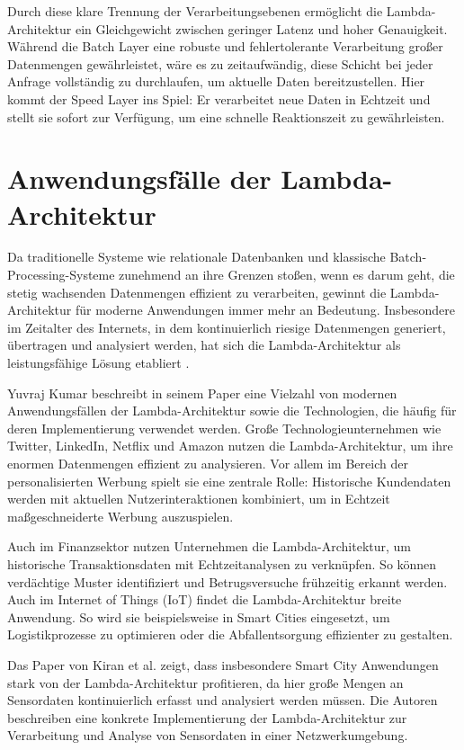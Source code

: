 Durch diese klare Trennung der Verarbeitungsebenen ermöglicht die Lambda-Architektur ein Gleichgewicht zwischen geringer Latenz und hoher Genauigkeit. Während die Batch Layer eine robuste und fehlertolerante Verarbeitung großer Datenmengen gewährleistet, wäre es zu zeitaufwändig, diese Schicht bei jeder Anfrage vollständig zu durchlaufen, um aktuelle Daten bereitzustellen. Hier kommt der Speed Layer ins Spiel: Er verarbeitet neue Daten in Echtzeit und stellt sie sofort zur Verfügung, um eine schnelle Reaktionszeit zu gewährleisten.

\section{Anwendungsfälle der Lambda-Architektur}
Da traditionelle Systeme wie relationale Datenbanken und klassische Batch-Processing-Systeme zunehmend an ihre Grenzen stoßen, wenn es darum geht, die stetig wachsenden Datenmengen effizient zu verarbeiten, gewinnt die Lambda-Architektur für moderne Anwendungen immer mehr an Bedeutung. Insbesondere im Zeitalter des Internets, in dem kontinuierlich riesige Datenmengen generiert, übertragen und analysiert werden, hat sich die Lambda-Architektur als leistungsfähige Lösung etabliert \cite{kumar2020lambda,kiran2015lambda,katkar2015study}.

Yuvraj Kumar \cite{kumar2020lambda} beschreibt in seinem Paper eine Vielzahl von modernen Anwendungsfällen der Lambda-Architektur sowie die Technologien, die häufig für deren Implementierung verwendet werden. Große Technologieunternehmen wie Twitter, LinkedIn, Netflix und Amazon nutzen die Lambda-Architektur, um ihre enormen Datenmengen effizient zu analysieren. Vor allem im Bereich der personalisierten Werbung spielt sie eine zentrale Rolle: Historische Kundendaten werden mit aktuellen Nutzerinteraktionen kombiniert, um in Echtzeit maßgeschneiderte Werbung auszuspielen.

Auch im Finanzsektor nutzen Unternehmen die Lambda-Architektur, um historische Transaktionsdaten mit Echtzeitanalysen zu verknüpfen. So können verdächtige Muster identifiziert und Betrugsversuche frühzeitig erkannt werden. Auch im Internet of Things (IoT) findet die Lambda-Architektur breite Anwendung. So wird sie beispielsweise in Smart Cities eingesetzt, um Logistikprozesse zu optimieren oder die Abfallentsorgung effizienter zu gestalten.

Das Paper von Kiran et al. \cite{kiran2015lambda} zeigt, dass insbesondere Smart City Anwendungen stark von der Lambda-Architektur profitieren, da hier große Mengen an Sensordaten kontinuierlich erfasst und analysiert werden müssen. Die Autoren beschreiben eine konkrete Implementierung der Lambda-Architektur zur Verarbeitung und Analyse von Sensordaten in einer Netzwerkumgebung.

